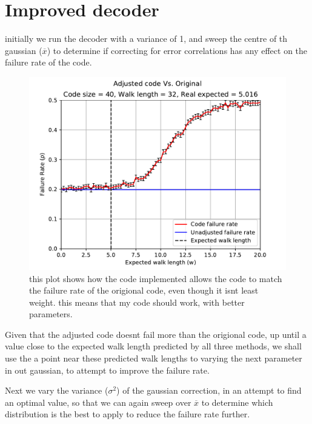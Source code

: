 \section{Improved decoder}
initially we run the decoder with a variance of 1, and sweep the centre of th gaussian ($\overline{x}$) to determine if correcting for error correlations has any effect on the failure rate of the code. 
\begin{figure}[htpb]
	\includegraphics{figs/var1xbarvsfailure}
	\caption{this plot shows how the code implemented allows the code to match the failure rate of the origional code, even though it isnt least weight. this means that my code should work, with better parameters.}
	\label{fig:xbarplot1}
\end{figure}
Given that the adjusted code doesnt fail more than the origional code, up until a value close to the expected walk length predicted by all three methods, we shall use the a point near these predicted walk lengths to varying the next parameter in out gaussian, to attempt to improve the failure rate. 

Next we vary the variance ($\sigma^2$) of the gaussian correction, in an attempt to find an optimal value, so that we can again sweep over $\overline{x}$ to determine which distribution is the best to apply to reduce the failure rate further. 

